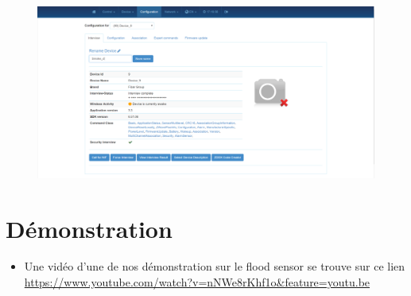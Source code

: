 \begin{itemize}
\begin{figure}[h]
\includegraphics[scale=0.5]{./Images/png/description_zwaveme.png}

\end{figure}
\end{itemize}


\section{Démonstration}
\begin{itemize}
	\item Une vidéo d'une de nos démonstration sur le flood sensor se trouve sur ce lien
	 \url{https://www.youtube.com/watch?v=nNWe8rKhf1o&feature=youtu.be}
\end{itemize}

